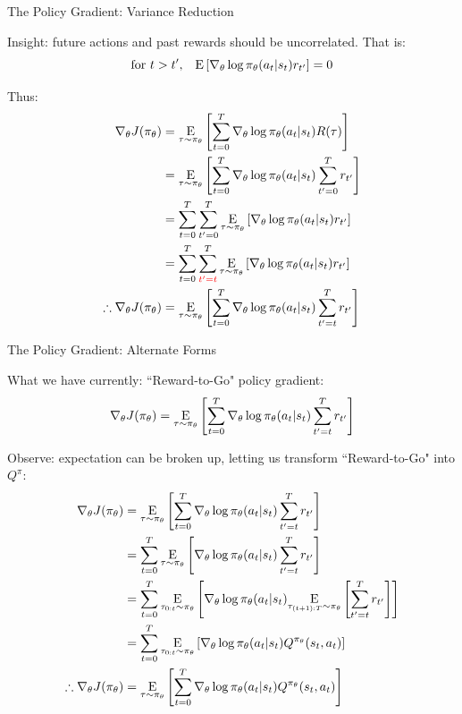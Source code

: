 \documentclass[9pt]{beamer}
\newcommand{\underE}[2]{\underset{\begin{subarray}{c}#1 \end{subarray}}{\E}\left[ #2 \right]}
\begin{document}
\begin{frame}{The Policy Gradient: Variance Reduction}

Insight: future actions and past rewards should be uncorrelated. That is:
%
\begin{equation*}
\text{for } t > t', \;\;\; {\mathrm E}\left[\nabla_{\theta} \log \pi_{\theta}(a_t | s_t) r_{t'}\right] = 0
\end{equation*}

Thus:
%
\begin{align*}
\nabla_{\theta} J(\pi_{\theta}) &= \underE{\tau \sim \pi_{\theta}}{\sum_{t=0}^T \nabla_{\theta} \log \pi_{\theta}(a_t | s_t) R(\tau)} \\
&= \underE{\tau \sim \pi_{\theta}}{\sum_{t=0}^T \nabla_{\theta} \log \pi_{\theta}(a_t | s_t) \sum_{t'=0}^T r_{t'}} \\
&= \sum_{t=0}^T \sum_{t'=0}^T \underE{\tau \sim \pi_{\theta}}{\nabla_{\theta} \log \pi_{\theta}(a_t | s_t)r_{t'}} \\
&= \sum_{t=0}^T \sum_{{\color{red}t'=t}}^T\underE{\tau \sim \pi_{\theta}}{\nabla_{\theta} \log \pi_{\theta}(a_t | s_t)r_{t'}} \\
\therefore \nabla_{\theta} J(\pi_{\theta}) &= \underE{\tau \sim \pi_{\theta}}{\sum_{t=0}^T \nabla_{\theta} \log \pi_{\theta}(a_t | s_t) \sum_{t'=t}^T r_{t'}} 
\end{align*}

\end{frame}

\begin{frame}{The Policy Gradient: Alternate Forms}

What we have currently: ``Reward-to-Go" policy gradient:
%
\begin{equation*}
\nabla_{\theta} J(\pi_{\theta}) = \underE{\tau \sim \pi_{\theta}}{\sum_{t=0}^T \nabla_{\theta} \log \pi_{\theta}(a_t | s_t) \sum_{t'=t}^T r_{t'}} 
\end{equation*}

Observe: expectation can be broken up, letting us transform ``Reward-to-Go" into $Q^{\pi}$:
%
\begin{align*}
\nabla_{\theta} J(\pi_{\theta}) &= \underE{\tau \sim \pi_{\theta}}{\sum_{t=0}^T \nabla_{\theta} \log \pi_{\theta}(a_t | s_t) \sum_{t'=t}^T r_{t'}} \\
&= \sum_{t=0}^T \underE{\tau \sim \pi_{\theta}}{\nabla_{\theta} \log \pi_{\theta}(a_t | s_t) \sum_{t'=t}^T r_{t'}} \\
&= \sum_{t=0}^T \underE{\tau_{0:t} \sim \pi_{\theta}}{\nabla_{\theta} \log \pi_{\theta}(a_t | s_t) \underE{\tau_{(t+1):T} \sim \pi_{\theta}}{\sum_{t'=t}^T r_{t'}}} \\
&= \sum_{t=0}^T \underE{\tau_{0:t} \sim \pi_{\theta}}{\nabla_{\theta} \log \pi_{\theta}(a_t | s_t) Q^{\pi_{\theta}}(s_t, a_t)} \\
\therefore \nabla_{\theta} J(\pi_{\theta}) &=\underE{\tau \sim \pi_{\theta}}{\sum_{t=0}^T \nabla_{\theta} \log \pi_{\theta}(a_t | s_t) Q^{\pi_{\theta}}(s_t, a_t)}
\end{align*}

\end{frame}
\end{document}
